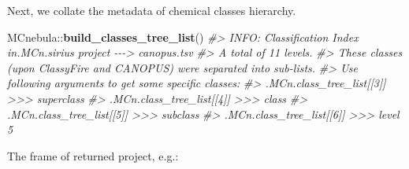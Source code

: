 \documentclass[]{tufte-handout}
\newenvironment{Shaded}{}{}
\newcommand{\CommentTok}[1]{\textcolor[rgb]{0.38,0.63,0.69}{\textit{#1}}}
\newcommand{\KeywordTok}[1]{\textcolor[rgb]{0.00,0.44,0.13}{\textbf{#1}}}
\newcommand{\NormalTok}[1]{#1}
\newcommand{\OperatorTok}[1]{\textcolor[rgb]{0.40,0.40,0.40}{#1}}
\begin{document}
Next, we collate the metadata of chemical classes hierarchy.

\begin{Shaded}
\begin{Highlighting}[]
\NormalTok{MCnebula}\OperatorTok{::}\KeywordTok{build\_classes\_tree\_list}\NormalTok{()}
\CommentTok{\#\textgreater{} INFO: Classification Index in.MCn.sirius project {-}{-}{-}\textgreater{} canopus.tsv }
\CommentTok{\#\textgreater{} A total of 11 levels.}
\CommentTok{\#\textgreater{} These classes (upon ClassyFire and CANOPUS) were separated into sub{-}lists.}
\CommentTok{\#\textgreater{}         Use following arguments to get some specific classes:}
\CommentTok{\#\textgreater{}         .MCn.class\_tree\_list[[3]] \textgreater{}\textgreater{}\textgreater{} superclass}
\CommentTok{\#\textgreater{}         .MCn.class\_tree\_list[[4]] \textgreater{}\textgreater{}\textgreater{} class}
\CommentTok{\#\textgreater{}         .MCn.class\_tree\_list[[5]] \textgreater{}\textgreater{}\textgreater{} subclass}
\CommentTok{\#\textgreater{}         .MCn.class\_tree\_list[[6]] \textgreater{}\textgreater{}\textgreater{} level 5}
\end{Highlighting}
\end{Shaded}

The frame of returned project, e.g.:
\end{document}

